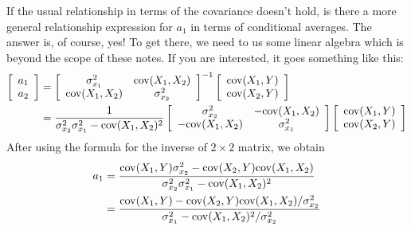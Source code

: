 If the usual relationship in terms of the covariance doesn't hold, is there a more general relationship expression for $a_1$ in terms of conditional averages. The answer is, of course, yes! To get there, we need to us some linear algebra which is beyond the scope of these notes. If you are interested, it goes something like this: 
\begin{align}
\left[\begin{array}{c}
a_1 \\
a_2 
\end{array}\right] &= \left[\begin{array}{cc}
\sigma_{x_1}^2 & {\rm cov}(X_1,X_2)\\
 {\rm cov}(X_1,X_2) & \sigma_{x_2}^2
 \end{array} \right]^{-1}\left[ \begin{array}{c}
 {\rm cov}(X_1,Y)\\
  {\rm cov}(X_2,Y)\\
  \end{array}\right]\\
  &=  \frac{1}{\sigma_{x_2}^2\sigma_{x_1}^2 -{\rm cov}(X_1,X_2)^2} \left[\begin{array}{cc}
\sigma_{x_2}^2 & -{\rm cov}(X_1,X_2)\\
- {\rm cov}(X_1,X_2) & \sigma_{x_1}^2
 \end{array} \right]\left[ \begin{array}{c}
 {\rm cov}(X_1,Y)\\
  {\rm cov}(X_2,Y)\\
  \end{array}\right]
\end{align}
After using the formula for the inverse of $2\times 2$ matrix, we obtain 
\begin{align}
a_1 &=     \frac{ {\rm cov}(X_1,Y)\sigma_{x_2}^2 - {\rm cov}(X_2,Y){\rm cov}(X_1,X_2)}{\sigma_{x_2}^2\sigma_{x_1}^2 -{\rm cov}(X_1,X_2)^2}\\
&= \frac{ {\rm cov}(X_1,Y)- {\rm cov}(X_2,Y){\rm cov}(X_1,X_2)/\sigma_{x_2}^2 }{\sigma_{x_1}^2 -{\rm cov}(X_1,X_2)^2/\sigma_{x_2}^2 }
\end{align}
